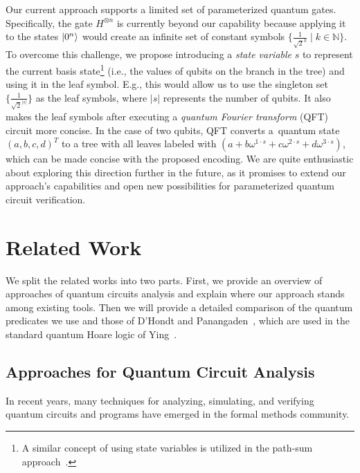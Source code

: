 Our current approach supports a limited set of parameterized quantum gates.
Specifically, the gate $H^{\otimes n}$ is currently beyond our capability
because applying it to the states ${\ket{0^n}}$ would create an infinite set of
constant symbols $\{\frac{1}{\sqrt{2}^{k}} \mid k\in \mathbb{N}\}$. To overcome
this challenge, we propose introducing a \emph{state variable} $s$ to represent
the current basis state\footnote{A similar concept of using state variables is
utilized in the path-sum approach~\cite{amy2018towards,Chareton2021}.} (i.e.,
the values of qubits on the branch in the tree) and using
it in the leaf symbol.
E.g., this would allow us to use the singleton
set $\{\frac{1}{\sqrt{2}^{{|s|}}}\}$ as the leaf symbols, where $|s|$ represents
the number of qubits. It also makes the leaf symbols after executing a
\emph{quantum Fourier transform} (QFT) circuit more concise.
In the case
of two qubits, QFT converts a~quantum state $(a,b,c,d)^T$ to a tree with all leaves
labeled with $(a+b\omega^{1\cdot s}+c\omega^{2\cdot s}+d\omega^{3\cdot s})$,
which can be made concise with the proposed encoding.
We are quite enthusiastic about exploring this direction further in the future,
as it promises to extend our approach's capabilities and open new possibilities
for parameterized quantum circuit verification.






\vspace{-0.0mm}
\section{Related Work}\label{sec:related}
\vspace{-0.0mm}
We split the related works into two parts. First, we provide an overview of
approaches of quantum circuits analysis and explain where our approach stands
among existing tools. Then we will provide a detailed comparison of the quantum
predicates we use and those of D'Hondt and Panangaden~\cite{d2006quantum}, which
are used in the standard quantum Hoare logic of Ying~\cite{ying2012floyd}.

\subsection{Approaches for Quantum Circuit Analysis}
In recent years, many techniques for analyzing, simulating, and verifying quantum circuits and programs have emerged in the formal methods community.

